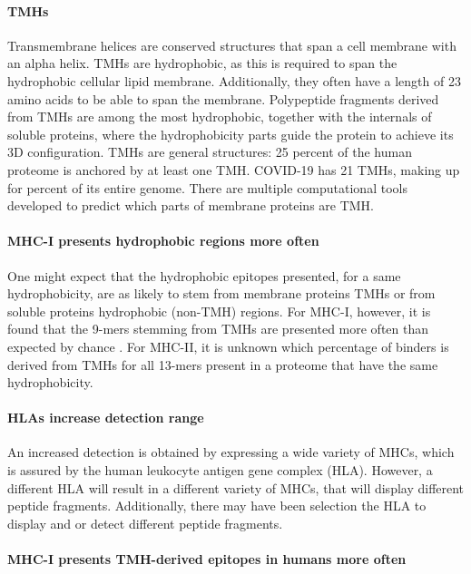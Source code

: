\paragraph{TMHs}

Transmembrane helices are conserved structures that span
a cell membrane with an alpha helix.
TMHs are hydrophobic, as this is required to span the 
hydrophobic cellular lipid membrane. Additionally,
they often have a length of 23 amino acids to be able to span
the membrane.
Polypeptide fragments derived from TMHs are among the most hydrophobic,
together with the internals of soluble proteins, where the
hydrophobicity parts guide the protein to achieve its 3D configuration.
TMHs are general structures: 25 percent of the human proteome is
anchored by at least one TMH. COVID-19 has 21 TMHs, 
making up for  percent of its entire genome.
There are multiple computational tools developed to predict which
parts of membrane proteins are TMH.

\paragraph{MHC-I presents hydrophobic regions more often}

One might expect that the hydrophobic epitopes presented,
for a same hydrophobicity, are as likely to stem from 
membrane proteins TMHs or from soluble proteins hydrophobic (non-TMH) regions.
For MHC-I, however, it is found that the 9-mers stemming
from TMHs are presented more often than expected by 
chance \cite{bianchi2017}
.
For MHC-II, it is unknown which percentage of binders 
is derived from TMHs for all 13-mers present in a proteome
that have the same hydrophobicity.

\paragraph{HLAs increase detection range}

An increased detection
is obtained by expressing a wide variety of
MHCs, which is assured by the human leukocyte antigen gene complex (HLA).
However, a different HLA will result in a different variety of MHCs,
that will display different peptide fragments. Additionally, there
may have been selection the HLA to display and or detect different
peptide fragments.

\paragraph{MHC-I presents TMH-derived epitopes in humans more often}

